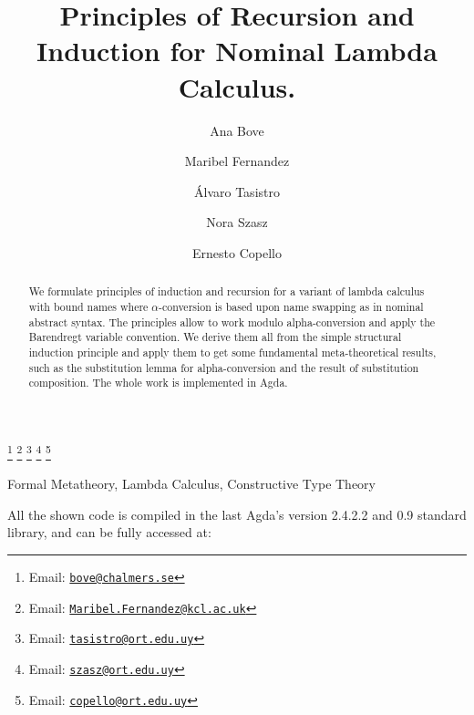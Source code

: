 \documentclass{entcs}
\newcommand{\alp}{\ensuremath{\alpha}}
\begin{document}
\begin{frontmatter}
  \title{Principles of Recursion and Induction for Nominal Lambda Calculus.}
  \author{Ana Bove }
  \address{Chalmers University of Technology\\
    Gothenburg, Sweden}
  \author{Maribel Fernandez }
  \address{King's College London\\
      London, England}
  \author{\'Alvaro Tasistro }
  \author{Nora Szasz }
  \author{Ernesto Copello }
  \address{Universidad ORT Uruguay\\
      Montevideo, Uruguay}
  \thanks[emailB]{Email: \href{mailto:bove@chalmers.se} {\texttt{\normalshape bove@chalmers.se}}}
  \thanks[emailF]{Email: \href{mailto:Maribel.Fernandez@kcl.ac.uk} {\texttt{\normalshape Maribel.Fernandez@kcl.ac.uk}}}
  \thanks[emailT]{Email: \href{mailto:tasistro@ort.edu.uy} {\texttt{\normalshape tasistro@ort.edu.uy}}} 
  \thanks[emailS]{Email: \href{mailto:szasz@ort.edu.uy} {\texttt{\normalshape szasz@ort.edu.uy}}}
  \thanks[emailC]{Email: \href{mailto:copello@ort.edu.uy} {\texttt{\normalshape copello@ort.edu.uy}}}

\begin{abstract} 
We formulate principles of induction and recursion for a variant of lambda calculus with bound names where \alp-conversion is based upon name swapping as in nominal abstract syntax. The principles allow to work modulo alpha-conversion and apply the Barendregt variable convention. We derive them all from the simple structural induction principle and apply them to get some fundamental meta-theoretical results, such as the substitution lemma for alpha-conversion and the result of substitution composition. The whole work is implemented in Agda.
\end{abstract}

\begin{keyword}
Formal Metatheory, Lambda Calculus, Constructive Type Theory
\end{keyword}

\end{frontmatter}

\maketitle

All the shown code is compiled in the last Agda's version 2.4.2.2 and 0.9 standard library, and can be fully accessed at:
\end{document}
